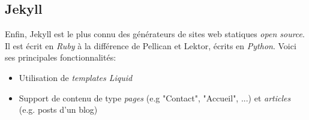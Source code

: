 	\subsection*{Jekyll}
	Enfin, Jekyll \cite{Jekyll} est le plus connu des générateurs de sites web statiques \textit{open source}. Il est écrit en \textit{Ruby} à la différence de Pellican et Lektor, écrits en \textit{Python}. Voici ses principales fonctionnalités:
	
	\begin{itemize}
		\item Utilisation de \textit{templates Liquid}
		\item Support de contenu de type \textit{pages} (e.g "Contact", "Accueil", ...) et \textit{articles} (e.g. posts d'un blog)
	\end{itemize}